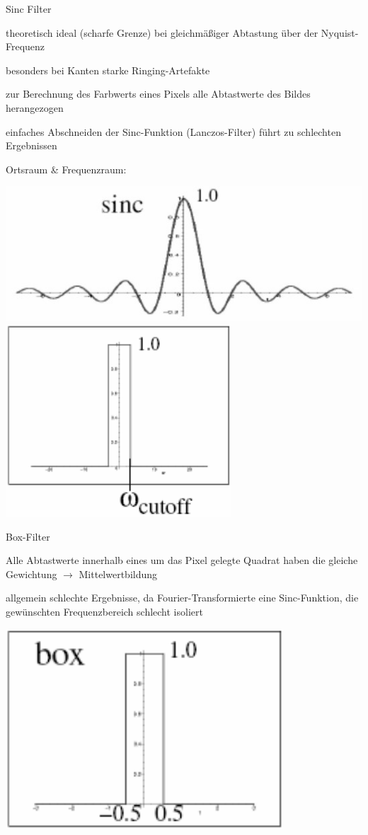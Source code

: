 \documentclass[landscape]{article}
\begin{document}
\begin{multicols}{3}
  \begin{description*}
    \item[Sinc Filter]
    \begin{itemize*}
      \item theoretisch ideal (scharfe Grenze) bei gleichmäßiger Abtastung über der Nyquist-Frequenz
      \item besonders bei Kanten starke Ringing-Artefakte 
      \item zur Berechnung des Farbwerts eines Pixels alle Abtastwerte des Bildes herangezogen
      \item einfaches Abschneiden der Sinc-Funktion (Lanczos-Filter) führt zu schlechten Ergebnissen
      \item Ortsraum \& Frequenzraum:
      \begin{center}
        \includegraphics[width=.4\linewidth]{Assets/Computergrafik_Sinc-filter1}
        \includegraphics[width=.4\linewidth]{Assets/Computergrafik_Sinc-filter2}
      \end{center}
    \end{itemize*}
    \item[Box-Filter]
    \begin{itemize*}
      \item Alle Abtastwerte innerhalb eines um das Pixel gelegte Quadrat haben die gleiche Gewichtung $\rightarrow$ Mittelwertbildung
      \item allgemein schlechte Ergebnisse, da Fourier-Transformierte eine Sinc-Funktion, die gewünschten Frequenzbereich schlecht isoliert
      \begin{center}
        \includegraphics[width=.4\linewidth]{Assets/Computergrafik_Box-filter1}

\end{center}
\end{itemize*}
\end{description*}
\end{multicols}
\end{document}
